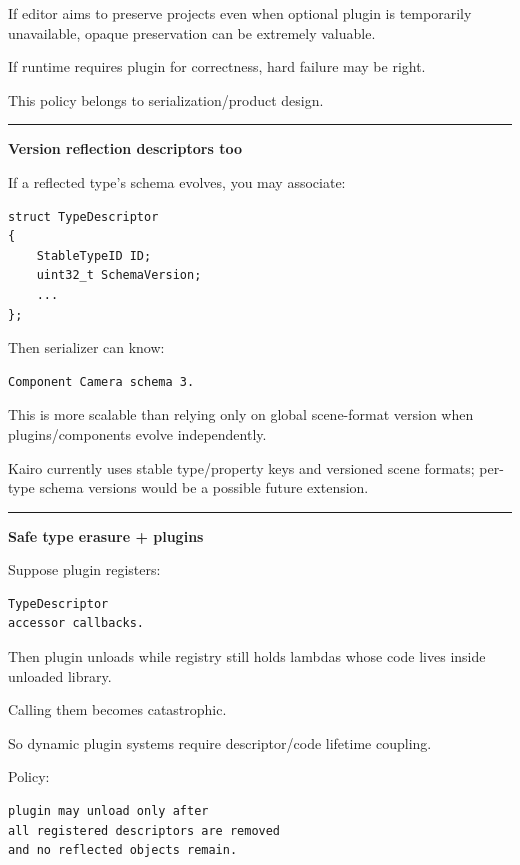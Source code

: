 If editor aims to preserve projects even when optional plugin is temporarily unavailable, opaque preservation can be extremely valuable.

If runtime requires plugin for correctness, hard failure may be right.

This policy belongs to serialization/product design.

\begin{center}\rule{0.5\linewidth}{0.5pt}\end{center}

\textbf{Version reflection descriptors too}

If a reflected type's schema evolves, you may associate:

\begin{verbatim}
struct TypeDescriptor
{
    StableTypeID ID;
    uint32_t SchemaVersion;
    ...
};
\end{verbatim}

Then serializer can know:

\begin{verbatim}
Component Camera schema 3.
\end{verbatim}

This is more scalable than relying only on global scene-format version when plugins/components evolve independently.

Kairo currently uses stable type/property keys and versioned scene formats; per-type schema versions would be a possible future extension.

\begin{center}\rule{0.5\linewidth}{0.5pt}\end{center}

\textbf{Safe type erasure + plugins}

Suppose plugin registers:

\begin{verbatim}
TypeDescriptor
accessor callbacks.
\end{verbatim}

Then plugin unloads while registry still holds  lambdas whose code lives inside unloaded library.

Calling them becomes catastrophic.

So dynamic plugin systems require descriptor/code lifetime coupling.

Policy:

\begin{verbatim}
plugin may unload only after
all registered descriptors are removed
and no reflected objects remain.
\end{verbatim}

